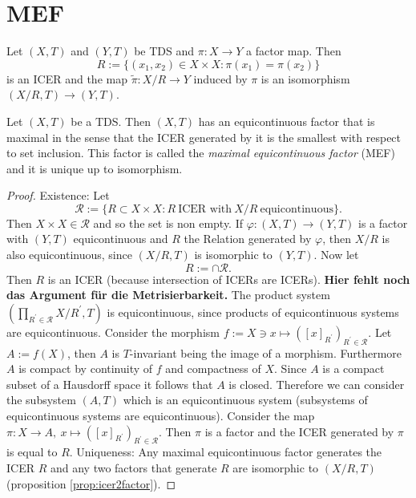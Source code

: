 \section{MEF}

\begin{proposition}
  \label{prop:icer2factor}
  Let $(X,T)$ and $(Y,T)$ be TDS and $\pi : X \to Y$ a factor map.
  Then 
  \begin{equation*}
    R:= \{ (x_1,x_2)  \in X \times X :  \pi (x_1) = \pi(x_2) \}
  \end{equation*}
  is an ICER and the map $\tilde{\pi}: X / R \to Y$ induced by $\pi$ is an isomorphism $(X/R,T) \to (Y,T)$.
\end{proposition}

\begin{theorem}
  Let $(X,T)$ be a TDS.
  Then $(X,T)$ has an equicontinuous factor that is maximal in the sense that the ICER generated by it is the smallest with respect to set inclusion. This factor is called the \emph{maximal equicontinuous factor} (MEF) and it is unique up to isomorphism.
\end{theorem}
\begin{proof}
  Existence:
  Let
  \begin{equation*}
    \mathcal{R} := \{ R \subset X \times X : R \ \text{ICER with} \ X/R \ \text{equicontinuous}\}.
  \end{equation*}
  Then $ X \times X \in \mathcal{R}$ and so the set is non empty.
  If $\varphi : (X,T)\to (Y,T)$ is a factor with $(Y,T)$ equicontinuous and $R$ the Relation generated by $\varphi$, then $X/R$ is also equicontinuous, since $(X/R,T)$ is isomorphic to $(Y,T)$.
  Now let 
  \begin{equation*}
    R:= \cap \mathcal{R}.
  \end{equation*}
  Then $R$ is an ICER (because intersection of ICERs are ICERs).
  \textbf{Hier fehlt noch das Argument für die Metrisierbarkeit.}
  The product system $(\prod_{R^\prime \in \mathcal{R}} X/R^\prime,T)$ is equicontinuous, since products of equicontinuous systems are equicontinuous.
Consider the morphism $f:= X \ni x  \mapsto ([x]_{R^\prime})_{R^\prime \in \mathcal{R}}$.
  Let $A:= f(X)$, then $A$ is $T$-invariant being the image of a morphism.
  Furthermore $A$ is compact by continuity of $f$ and compactness of $X$.
  Since $A$ is a compact subset of a Hausdorff space it follows that $A$ is closed.
  Therefore we can consider the subsystem $(A,T)$ which is an equicontinuous system (subsystems of equicontinuous systems are equicontinuous).
  Consider the map $\pi: X \to  A , \  x  \mapsto ([x]_{R^\prime})_{R^\prime \in \mathcal{R}}$.
  Then $\pi$ is a factor and the ICER generated by $\pi$ is equal to $R$.
  Uniqueness:
  Any maximal equicontinuous factor generates the ICER $R$ and any two factors that generate $R$ are isomorphic to $(X/R,T)$ (proposition \ref{prop:icer2factor}).
\end{proof}
